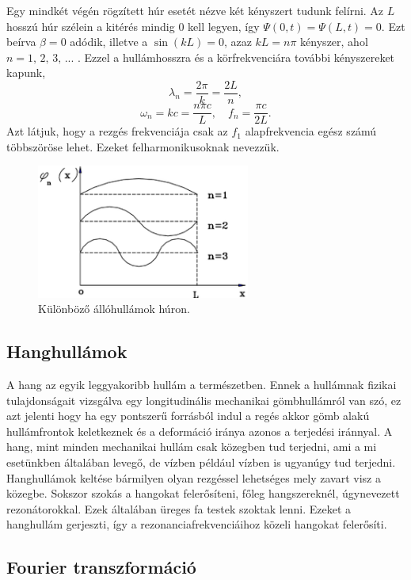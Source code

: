 \documentclass[a4paper,12pt]{article}
\begin{document}
Egy mindkét végén rögzített húr esetét nézve két kényszert tudunk felírni. Az $L$ hosszú húr szélein a kitérés mindig $0$ kell legyen, így $\Psi(0, t) = \Psi(L, t) = 0$. Ezt beírva $\beta = 0$ adódik, illetve a $\sin(k L) = 0$, azaz $k L = n \pi$ kényszer, ahol $n = \text{1, 2, 3, ...}$ . Ezzel a hullámhosszra és a körfrekvenciára további kényszereket kapunk,
$$ \lambda_n = \frac{2 \pi}{k} = \dfrac{2 L}{n}, $$
$$ \omega_n = k c = \frac{n \pi c}{L}, \quad f_n = \frac{\pi c}{2 L}. $$
Azt látjuk, hogy a rezgés frekvenciája csak az $f_1$ alapfrekvencia egész számú többszöröse lehet. Ezeket felharmonikusoknak nevezzük.

\begin{figure}[h!]
\centering
\includegraphics[width=7cm]{allohullam.png}
\caption{Különböző állóhullámok húron. \cite{mintamuszer}}
\end{figure}

\subsection{Hanghullámok}

A hang az egyik leggyakoribb hullám a természetben. Ennek a hullámnak fizikai tulajdonságait vizsgálva egy longitudinális mechanikai gömbhullámról van szó, ez azt jelenti hogy ha egy pontszerű forrásból indul a regés akkor gömb alakú hullámfrontok keletkeznek és a deformáció iránya azonos a terjedési iránnyal. A hang, mint minden mechanikai hullám csak közegben tud terjedni, ami a mi esetünkben általában levegő, de vízben például vízben is ugyanúgy tud terjedni. Hanghullámok keltése bármilyen olyan rezgéssel lehetséges mely zavart visz a közegbe. Sokszor szokás a hangokat felerősíteni, főleg hangszereknél, úgynevezett rezonátorokkal. Ezek általában üreges fa testek szoktak lenni. Ezeket a hanghullám gerjeszti, így a rezonanciafrekvenciáihoz közeli hangokat felerősíti.

\subsection{Fourier transzformáció}
\end{document}
